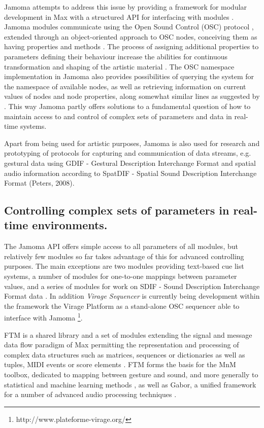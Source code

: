 \documentclass{article}
\begin{document}
Jamoma attempts to address this issue by providing a framework for modular development in Max with a structured API for interfacing with modules \cite{Place:2006jamoma}. Jamoma modules communicate using the Open Sound Control (OSC) protocol \cite{Wright_2002_OSC}, extended through an object-oriented approach to OSC nodes, conceiving them as having properties and methods \cite{Place:2008osc_properties}. The process of assigning additional properties to parameters defining their behaviour increase the abilities for continuous transformation and shaping of the artistic material \cite{Place_2008_flexible_control}. The OSC namespace implementation in Jamoma also provides possibilities of querying the system for the namespace of available nodes, as well as retrieving information on current values of nodes and node properties, along somewhat similar lines as suggested by \cite{Jazzmutant:2006_osc2}. This way Jamoma partly offers solutions to a fundamental question of how to maintain access to and control of complex sets of parameters and data in real-time systems.

Apart from being used for artistic purposes, Jamoma is also used for research and prototyping of protocols for capturing and communication of data streams, e.g. gestural data using GDIF - Gestural Description Interchange Format \cite{Jensenius:2006a, Nymoen_2008_GDIF_sync} and spatial audio information according to SpatDIF - Spatial Sound Description Interchange Format (Peters, 2008).

\subsection{Controlling complex sets of parameters in real-time environments.}\label{sec:intro-complex-control}

The Jamoma  API offers simple access to all parameters of all modules, but relatively few modules so far takes advantage of this for advanced controlling purposes. The main exceptions are two modules providing text-based cue list systems, a number of modules for one-to-one mappings between parameter values, and a series of modules for work on SDIF - Sound Description Interchange Format data \cite{Nymoen_2008_GDIF_sync}. In addition \emph{Virage Sequencer} is currently being development within the framework the Virage Platform as a stand-alone OSC sequencer able to interface with Jamoma \footnote{http://www.plateforme-virage.org/}.

FTM is a shared library and a set of modules extending the signal and message data ﬂow paradigm of Max permitting the representation and processing of complex data structures such as matrices, sequences or dictionaries as well as tuples, MIDI events or score elements \cite{Schnell:2005ftm}. FTM forms the basis for the MnM toolbox, dedicated to mapping between gesture and sound, and more generally to statistical and machine learning methods \cite{Bevilacqua:2005mnm}, as well as Gabor, a unified framework for a number of advanced audio processing techniques \cite{Schnell_2005_Gabor}.
\end{document}
